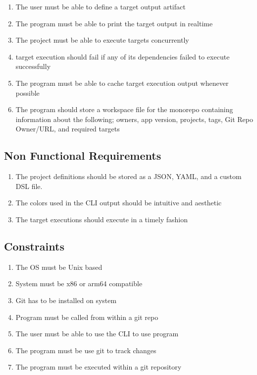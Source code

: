 \documentclass[11pt]{article}
\begin{document}
\begin{enumerate}
    \item The user must be able to define a \gls{target} output artifact
    \item The program must be able to print the \gls{target} output in realtime
    \item The project must be able to execute \glspl{target} concurrently
    \item \Gls{target execution} should fail if any of its dependencies failed to execute successfully
    \item The program must be able to \gls{cache} \gls{target execution} output whenever possible
    \item The program should store a workspace file for the monorepo containing information about the following; owners, app version,
    projects, tags, Git Repo Owner/URL, and required targets
\end{enumerate}

\subsection{Non Functional Requirements}
\begin{enumerate}
    \item The \glspl{project definition} should be stored as a JSON, YAML, and a custom \Gls{DSL} file.
    \item The colors used in the CLI output should be intuitive and aesthetic
    \item The \glspl{target execution} should execute in a timely fashion
\end{enumerate}

\subsection{Constraints}
\label{sec:constraints}
\begin{enumerate}
    \item The OS must be Unix based
    \item System must be x86 or arm64 compatible
    \item Git has to be installed on system
    \item Program must be called from within a git repo
    \item The user must be able to use the CLI to use program
    \item The program must be use git to track changes
    \item The program must be executed within a git repository
\end{enumerate}
\end{document}
